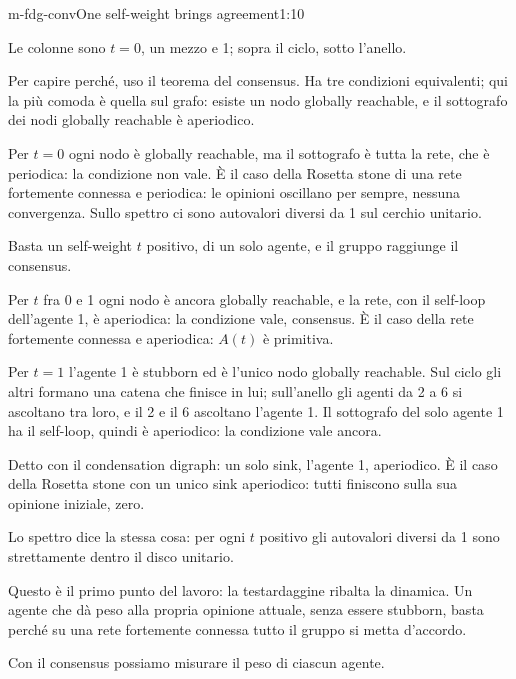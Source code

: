 \begin{slide}{m-fdg-conv}{One self-weight brings agreement}{1:10}
  \begin{discorso}
    \item Le colonne sono $t=0$, un mezzo e 1; sopra il ciclo, sotto l'anello.
    \item Per capire perché, uso il teorema del consensus. Ha tre condizioni equivalenti; qui la più comoda è quella sul grafo: esiste un nodo globally reachable, e il sottografo dei nodi globally reachable è aperiodico.
    \item Per $t=0$ ogni nodo è globally reachable, ma il sottografo è tutta la rete, che è periodica: la condizione non vale. È il caso della Rosetta stone di una rete fortemente connessa e periodica: le opinioni oscillano per sempre, nessuna convergenza. Sullo spettro ci sono autovalori diversi da 1 sul cerchio unitario.
    \item Basta un self-weight $t$ positivo, di un solo agente, e il gruppo raggiunge il consensus.
    \item Per $t$ fra 0 e 1 ogni nodo è ancora globally reachable, e la rete, con il self-loop dell'agente 1, è aperiodica: la condizione vale, consensus. È il caso della rete fortemente connessa e aperiodica: $A(t)$ è primitiva.
    \item Per $t=1$ l'agente 1 è stubborn ed è l'unico nodo globally reachable. Sul ciclo gli altri formano una catena che finisce in lui; sull'anello gli agenti da 2 a 6 si ascoltano tra loro, e il 2 e il 6 ascoltano l'agente 1. Il sottografo del solo agente 1 ha il self-loop, quindi è aperiodico: la condizione vale ancora.
    \item Detto con il condensation digraph: un solo sink, l'agente 1, aperiodico. È il caso della Rosetta stone con un unico sink aperiodico: tutti finiscono sulla sua opinione iniziale, zero.
    \item Lo spettro dice la stessa cosa: per ogni $t$ positivo gli autovalori diversi da 1 sono strettamente dentro il disco unitario.
    \item Questo è il primo punto del lavoro: la testardaggine ribalta la dinamica. Un agente che dà peso alla propria opinione attuale, senza essere stubborn, basta perché su una rete fortemente connessa tutto il gruppo si metta d'accordo.
    \item Con il consensus possiamo misurare il peso di ciascun agente.
  \end{discorso}
\end{slide}

